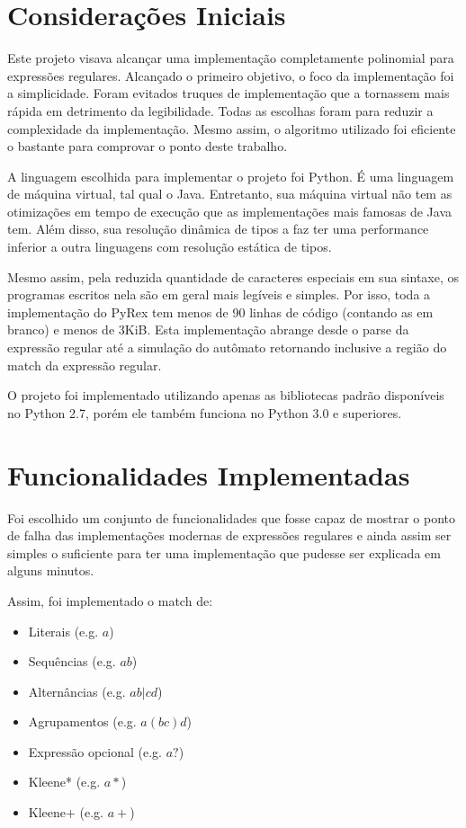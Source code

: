 \documentclass[a4paper,12pt,oneside,onecolumn]{uerj}
\begin{document}
\section{Considerações Iniciais}

Este projeto visava alcançar uma implementação completamente polinomial para expressões regulares. Alcançado o primeiro objetivo, o foco da implementação foi a simplicidade. Foram evitados truques de implementação que a tornassem mais rápida em detrimento da legibilidade. Todas as escolhas foram para reduzir a complexidade da implementação. Mesmo assim, o algoritmo utilizado foi eficiente o bastante para comprovar o ponto deste trabalho.

A linguagem escolhida para implementar o projeto foi Python. É uma linguagem de máquina virtual, tal qual o Java. Entretanto, sua máquina virtual não tem as otimizações em tempo de execução que as implementações mais famosas de Java tem. Além disso, sua resolução dinâmica de tipos a faz ter uma performance inferior a outra linguagens com resolução estática de tipos. 

Mesmo assim, pela reduzida quantidade de caracteres especiais em sua sintaxe, os programas escritos nela são em geral mais legíveis e simples. Por isso, toda a implementação do PyRex tem menos de 90 linhas de código (contando as em branco) e menos de 3KiB. Esta implementação abrange desde o parse da expressão regular até a simulação do autômato retornando inclusive a região do match da expressão regular.

O projeto foi implementado utilizando apenas as bibliotecas padrão disponíveis no Python 2.7, porém ele também funciona no Python 3.0 e superiores.

\section{Funcionalidades Implementadas}

Foi escolhido um conjunto de funcionalidades que fosse capaz de mostrar o ponto de falha das implementações modernas de expressões regulares e ainda assim ser simples o suficiente para ter uma implementação que pudesse ser explicada em alguns minutos.

Assim, foi implementado o match de:

\begin{itemize}
    \item Literais (e.g. $a$)
    \item Sequências (e.g. $ab$)
    \item Alternâncias (e.g. $ab|cd$)
    \item Agrupamentos (e.g. $a(bc)d$)
    \item Expressão opcional (e.g. $a?$)
    \item Kleene* (e.g. $a*$)
    \item Kleene+ (e.g. $a+$)
\end{itemize}
\end{document}
